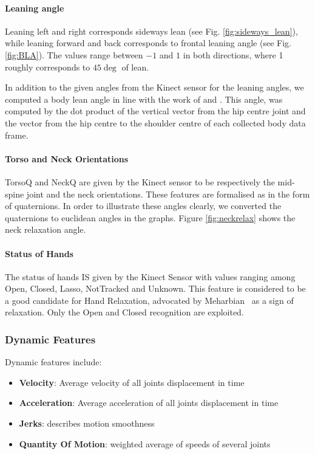 \paragraph{Leaning angle}
Leaning left and right corresponds sideways lean (see Fig. \ref{fig:sideways_lean}), while leaning forward and back corresponds to frontal leaning angle (see Fig. \ref{fig:BLA}).
The values range between $-1$ and $1$ in both directions, where 1 roughly corresponds to $45\deg$ of lean.

In addition to the given angles from the Kinect sensor for the leaning angles, we computed a body lean angle in line with the work of \cite{Castellano2009} and \cite{Schegloff}. This angle, was computed by the dot product of the vertical vector from the hip centre joint and the vector from the hip centre to the shoulder centre of each collected body data frame.

\paragraph{Torso and Neck Orientations}
TorsoQ and NeckQ are given by the Kinect sensor to be respectively the mid-spine joint and the neck orientations.
These features are formalised as in the form of quaternions.
In order to illustrate  these angles clearly, we converted the quaternions to euclidean angles in the graphs.
Figure \ref{fig:neckrelax} shows the neck relaxation angle.


\paragraph{Status of Hands}
The status of hands IS given by the Kinect Sensor with values ranging among Open, Closed, Lasso, NotTracked and Unknown.
This feature is considered to be a good candidate for Hand Relaxation, advocated by Meharbian~\cite{Mehrabian1968} as a sign of relaxation.
Only the Open and Closed recognition are exploited.

\subsubsection{Dynamic Features}
Dynamic features include:
\begin{itemize}[noitemsep,nolistsep]
\item \textbf{Velocity}: Average velocity of all joints displacement in time
\item \textbf{Acceleration}: Average acceleration of all joints displacement in time
\item \textbf{Jerks}: describes motion smoothness
\item \textbf{Quantity Of Motion}: weighted average of speeds of several joints
\end{itemize}





